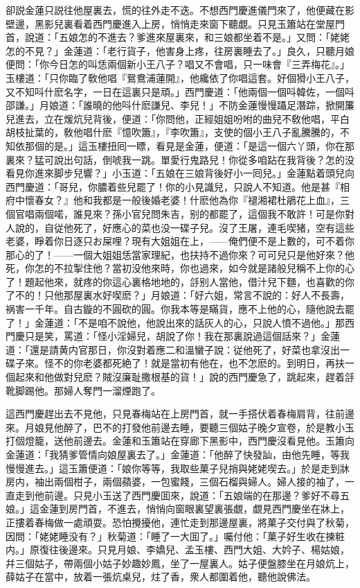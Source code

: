 卻説金蓮只説往他屋裏去，慌的往外走不迭。不想西門慶進儀門來了，他便藏在影壁邊，黑影兒裏看着西門慶進入上房，悄悄走來窗下聽覷。只見玉簫站在堂屋門首，說道：「五娘怎的不進去？爹進來屋裏來，和三娘都坐着不是。」又問：「姥姥怎的不見？」金蓮道：「老行貨子，他害身上疼，往房裏睡去了。」良久，只聽月娘便問：「你今日怎的叫恁兩個新小王八子？唱又不會唱，只一味會『三弄梅花』。」玉樓道：「只你臨了敎他唱『鴛鴦浦蓮開』，他纔依了你唱這套。好個猾小王八子，又不知呌什麽名字，一日在這裏只是頑。」西門慶道：「他兩個一個呌韓佐，一個呌邵謙。」月娘道：「誰曉的他呌什麽謙兒、李兒！」不防金蓮慢慢躡足潛踪，掀開簾兒進去，立在煖炕兒背後，便道：「你問他，正經姐姐吩咐的曲兒不敎他唱，平白胡枝扯葉的，敎他唱什麽『憶吹簫』，『李吹簫』，支使的個小王八子亂騰騰的，不知依那個的是。」這玉樓扭囘一瞟，看見是金蓮，便道：「是這一個六丫頭，你在那裏來？猛可說出句話，倒唬我一跳。單愛行鬼路兒！你從多咱跕在我背後？怎的没看見你進來脚步兒響？」小玉道：「五娘在三娘背後好小一囘兒。」金蓮點着頭兒向西門慶道：「哥兒，你膿着些兒罷了！你的小見識兒，只說人不知道。他是甚『相府中懷春女？』他和我都是一般後婚老婆！什麽他為你『褪湘裙杜鵑花上血』，三個官唱兩個喏，誰見來？孫小官兒問朱吉，别的都罷了，這個我不敢許！可是你對人說的，自従他死了，好應心的菜也没一碟子兒。沒了王屠，連毛喫猪，空有這些老婆，睜着你日逐只お屎哩？現有大姐姐在上，——俺們便不是上數的，可不着你那心的了！——一個大姐姐恁當家理紀，也扶持不過你來？可可兒只是他好來？他死，你怎的不拉掣住他？當初没他來時，你也過來，如今就是諸般兒稱不上你的心了！題起他來，就疼的你這心裏格地地的，㧱别人當他，借汁兒下麵，也喜歡的你了不的！只他那屋裏水好喫麽？」月娘道：「好六姐，常言不說的：好人不長壽，祸害一千年。自古鏇的不圓砍的圓。你我本等是瞞貨，應不上他的心，隨他說去罷了！」金蓮道：「不是咱不說他，他說出來的話灰人的心，只說人憤不過他。」那西門慶只是笑，罵道：「怪小淫婦兒，胡說了你！我在那裏說過這個話來？」金蓮道：「還是請黄内官那日，你沒對着應二和溫蠻子說：従他死了，好菜也拿沒出一碟子來。怪不的你老婆都死絶了！就是當初有他在，也不怎麽的。到明日，再扶一個起來和他做對兒麽？賊沒廉耻撒根基的貨！」說的西門慶急了，跳起來，趕着㧱靴脚踢他。那婦人奪門一溜煙跑了。

這西門慶趕出去不見他，只見春梅站在上房門首，就一手搭伏着春梅肩背，往前邊來。月娘見他醉了，巴不的打發他前邊去睡，要聽三個姑子晚夕宣卷，於是教小玉打個燈籠，送他前邊去。金蓮和玉簫站在穿廊下黑影中，西門慶沒看見他。玉簫向金蓮道：「我猜爹管情向娘屋裏去了。」金蓮道：「他醉了快發訕，由他先睡，等我慢慢進去。」這玉簫便道：「娘你等等，我取些菓子兒捎與姥姥喫去。」於是走到牀房内，袖出兩個柑子，兩個蘋婆，一包蜜餞，三個石榴與婦人。婦人接的袖了，一直走到他前邊。只見小玉送了西門慶囬來，說道：「五娘端的在那邊？爹好不尋五娘。」這金蓮到房門首，不進去，悄悄向窗眼裏望裏張覷，覷見西門慶坐在牀上，正摟着春梅做一處頑耍。恐怕攪擾他，連忙走到那邊屋裏，將菓子交付與了秋菊，因問：「姥姥睡没有？」秋菊道：「睡了一大囬了。」囑付他：「菓子好生收在揀粧内。」原復往後邊來。只見月娘、李嬌兒、孟玉樓、西門大姐、大妗子、楊姑娘，幷三個姑子，帶兩個小姑子妙趣妙鳳，坐了一屋裏人。姑子便盤膝坐在月娘炕上，薛姑子在當中，放着一張炕桌兒，炷了香，衆人都圍着他，聽他說佛法。

